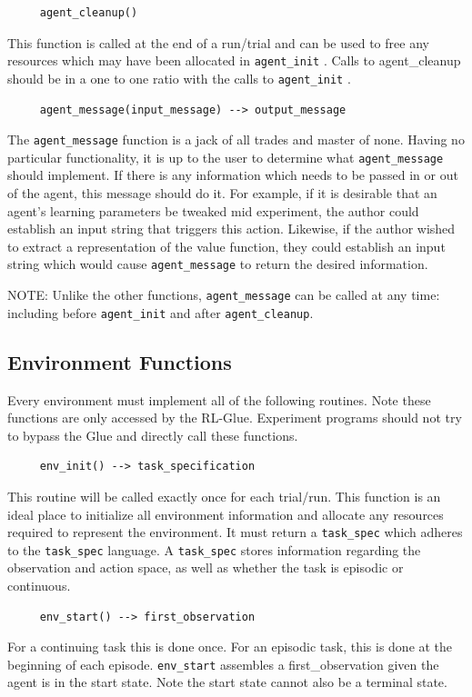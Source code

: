 \documentclass[11pt]{article}
\begin{document}
\begin{verbatim}
     agent_cleanup()
\end{verbatim}     
This function is called at the end of a run/trial and can be used to free any resources which may have been allocated in \texttt{agent\_init} . Calls to agent\_cleanup should be in a one to one ratio with the calls to \texttt{agent\_init} .

\begin{verbatim}
     agent_message(input_message) --> output_message
\end{verbatim}     
The \texttt{agent\_message} function is a jack of all trades and master of none. Having no particular functionality, it is up to the user to determine what \texttt{agent\_message} should implement. If there is any information which needs to be passed in or out of the agent, this message should do it. For example, if it is desirable that an agent's learning parameters be tweaked mid experiment, the author could establish an input string that triggers this action. Likewise, if the author wished to extract a representation of the value function, they could establish an input string which would cause \texttt{agent\_message} to return the desired information.

NOTE: Unlike the other functions, \texttt{agent\_message} can be called at any time: including before \texttt{agent\_init} and after \texttt{agent\_cleanup}.
                          
\subsection{Environment Functions}
\label{Eref}
Every environment must implement all of the following routines. Note these functions are only accessed by the RL-Glue. Experiment programs should not try to bypass the Glue and directly call these functions.
\begin{verbatim}
     env_init() --> task_specification
\end{verbatim}
This routine will be called exactly once for each trial/run. This function is an ideal place to initialize all environment information and allocate any resources required to represent the environment. It must return a \texttt{task\_spec} which adheres to the \texttt{task\_spec} language. A \texttt{task\_spec} stores information regarding the observation and action space, as well as whether the task is episodic or continuous.

\begin{verbatim}
     env_start() --> first_observation\end{verbatim}
For a continuing task this is done once. For an episodic task, this is done at the beginning of each episode. \texttt{env\_start} assembles a first\_observation given the agent is in the start state. Note the start state cannot also be a terminal state.
\end{document}
